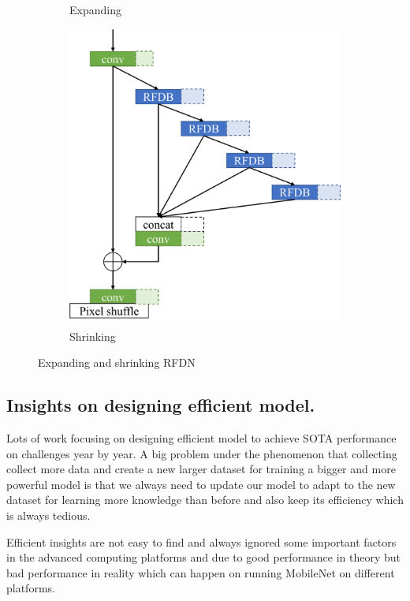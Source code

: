 \documentclass[10pt,twocolumn,letterpaper]{article}
\begin{document}
\begin{figure}
\begin{subfigure}[b]{0.49\linewidth}
        \caption{Expanding}
        \label{fig:Expanding}
    \end{subfigure}
    \begin{subfigure}[b]{0.49\linewidth}
		\centering
        \includegraphics[width=\textwidth]{../shrink.pdf}
        \caption{Shrinking}
        \label{fig:Shrinking}
    \end{subfigure}
    \caption{Expanding and shrinking RFDN}
    \label{fig:PRFDN}
\end{figure}

\subsection{Insights on designing efficient model.}
Lots of work focusing on designing efficient model to achieve SOTA performance on challenges year by year. A big problem under the phenomenon that collecting collect more data and create a new larger dataset for training a bigger and more powerful model is that we always need to update our model to adapt to the new dataset for learning more knowledge than before and also keep its efficiency which is always tedious.

Efficient insights are not easy to find and always ignored some important factors in the advanced computing platforms and due to good performance in theory but bad performance in reality which can happen on running MobileNet on different platforms.
\end{document}
